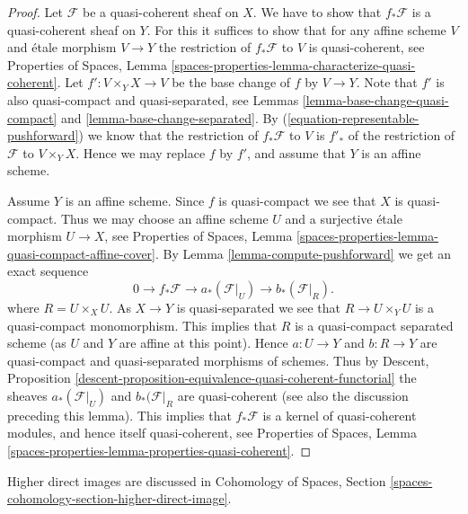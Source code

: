 \begin{proof}
Let $\mathcal{F}$ be a quasi-coherent sheaf on $X$. We have to show that
$f_*\mathcal{F}$ is a quasi-coherent sheaf on $Y$. For this it suffices
to show that for any affine scheme $V$ and \'etale morphism $V \to Y$
the restriction of $f_*\mathcal{F}$ to $V$ is quasi-coherent, see
Properties of Spaces,
Lemma \ref{spaces-properties-lemma-characterize-quasi-coherent}.
Let $f' : V \times_Y X \to V$
be the base change of $f$ by $V \to Y$. Note that $f'$ is also
quasi-compact and quasi-separated, see
Lemmas \ref{lemma-base-change-quasi-compact} and
\ref{lemma-base-change-separated}.
By (\ref{equation-representable-pushforward})
we know that the restriction of $f_*\mathcal{F}$ to $V$ is $f'_*$ of the
restriction of $\mathcal{F}$ to $V \times_Y X$. Hence
we may replace $f$ by $f'$, and assume that $Y$ is an affine scheme.

\medskip\noindent
Assume $Y$ is an affine scheme. Since $f$ is quasi-compact we see that $X$
is quasi-compact. Thus we may choose an affine scheme $U$ and a surjective
\'etale morphism $U \to X$, see
Properties of Spaces,
Lemma \ref{spaces-properties-lemma-quasi-compact-affine-cover}.
By Lemma \ref{lemma-compute-pushforward} we get an exact sequence
$$
0 \to f_*\mathcal{F} \to a_*(\mathcal{F}|_U) \to b_*(\mathcal{F}|_R).
$$
where $R = U \times_X U$.
As $X \to Y$ is quasi-separated we see that $R \to U \times_Y U$
is a quasi-compact monomorphism. This implies that $R$ is a quasi-compact
separated scheme (as $U$ and $Y$ are affine at this point).
Hence $a : U \to Y$ and $b : R \to Y$ are quasi-compact and
quasi-separated morphisms of schemes. Thus by
Descent,
Proposition \ref{descent-proposition-equivalence-quasi-coherent-functorial}
the sheaves $a_*(\mathcal{F}|_U)$ and $b_*(\mathcal{F}|_R$
are quasi-coherent (see also the discussion preceding this lemma).
This implies that $f_*\mathcal{F}$ is a kernel of
quasi-coherent modules, and hence itself quasi-coherent, see
Properties of Spaces,
Lemma \ref{spaces-properties-lemma-properties-quasi-coherent}.
\end{proof}

\noindent
Higher direct images are discussed in
Cohomology of Spaces, Section
\ref{spaces-cohomology-section-higher-direct-image}.




















